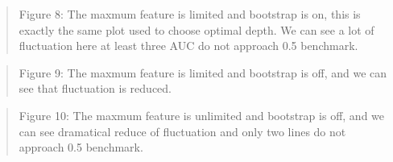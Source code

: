 \documentclass{article}
\newcommand{\ciapdf}[1]{\vspace*{-\parskip}\resizebox{0.75\textwidth}{!}{\texttt{[image: \#1]}}}
\begin{document}
\ciapdf{app_samedata_1.pdf}

\ciapdf{app_samedata_2.pdf}

\ciapdf{Figure_8.pdf}
\begin{quote}
Figure 8: The maxmum feature is limited and bootstrap is on, this is
exactly the same plot used to choose optimal depth. We can see a lot of
fluctuation here at least three AUC do not approach 0.5 benchmark.
\end{quote}

\ciapdf{Figure_9.pdf}
\begin{quote}
Figure 9: The maxmum feature is limited and bootstrap is off, and we can
see that fluctuation is reduced.
\end{quote}

\ciapdf{Figure_10.pdf}
\begin{quote}
Figure 10: The maxmum feature is unlimited and bootstrap is off, and we
can see dramatical reduce of fluctuation and only two lines do not
approach 0.5 benchmark.
\end{quote}
\end{document}
